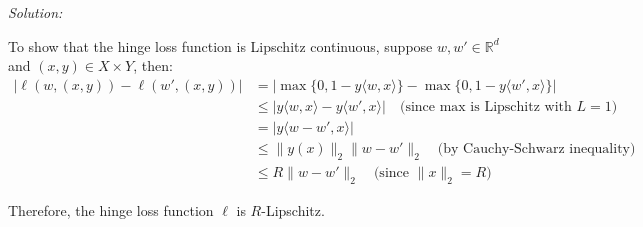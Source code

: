 \documentclass[
	10pt, %
	a4paper, %
	oneside, %
	headinclude,footinclude, %
	BCOR5mm, %
]{scrartcl}
\newenvironment{solution}
{\textit{Solution:}}
{}
\begin{document}
\begin{solution}

	To show that the hinge loss function is Lipschitz continuous, suppose $w, w' \in \mathbb{R}^d$ and $(x, y) \in X \times Y$, then: \begin{align*}
		| \ell(w, (x, y)) - \ell(w', (x, y)) | & = | \max\{0, 1 - y\langle w, x \rangle\} - \max\{0, 1 - y\langle w', x \rangle\} |                       \\
		                                       & \leq | y\langle w, x \rangle - y\langle w', x \rangle | \quad \text{(since max is Lipschitz with $L=1$)} \\
		                                       & = | y\langle w - w', x \rangle |                                                                         \\
		                                       & \leq \| y(x) \|_2 \| w - w' \|_2 \quad \text{(by Cauchy-Schwarz inequality)}                             \\
		                                       & \leq R \| w - w' \|_2 \quad \text{(since $\| x \|_2 = R$)}
	\end{align*}

	Therefore, the hinge loss function $\ell$ is $R$-Lipschitz.
\end{solution}


\end{document}
